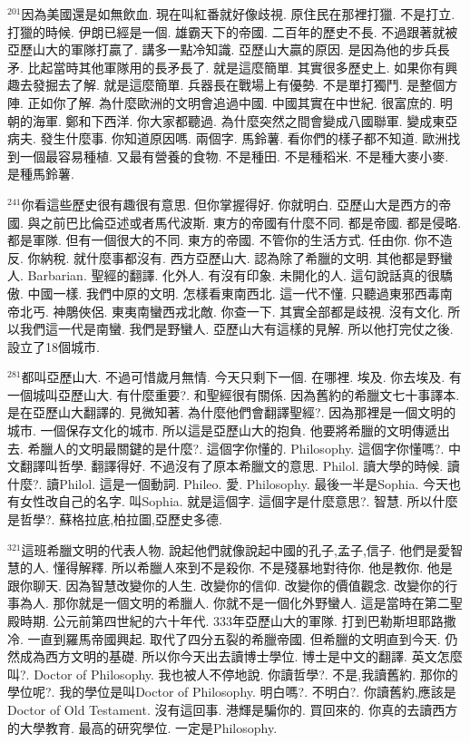 \documentclass{book}
\begin{document}
$^{201}$因為美國還是如無飲血.
現在叫紅番就好像歧視.
原住民在那裡打獵.
不是打立.
打獵的時候.
伊朗已經是一個.
雄霸天下的帝國.
二百年的歷史不長.
不過跟著就被亞歷山大的軍隊打贏了.
講多一點冷知識.
亞歷山大贏的原因.
是因為他的步兵長矛.
比起當時其他軍隊用的長矛長了.
就是這麼簡單.
其實很多歷史上.
如果你有興趣去發掘去了解.
就是這麼簡單.
兵器長在戰場上有優勢.
不是單打獨鬥.
是整個方陣.
正如你了解.
為什麼歐洲的文明會追過中國.
中國其實在中世紀.
很富庶的.
明朝的海軍.
鄭和下西洋.
你大家都聽過.
為什麼突然之間會變成八國聯軍.
變成東亞病夫.
發生什麼事.
你知道原因嗎.
兩個字.
馬鈴薯.
看你們的樣子都不知道.
歐洲找到一個最容易種植.
又最有營養的食物.
不是種田.
不是種稻米.
不是種大麥小麥.
是種馬鈴薯.

$^{241}$你看這些歷史很有趣很有意思.
但你掌握得好.
你就明白.
亞歷山大是西方的帝國.
與之前巴比倫亞述或者馬代波斯.
東方的帝國有什麼不同.
都是帝國.
都是侵略.
都是軍隊.
但有一個很大的不同.
東方的帝國.
不管你的生活方式.
任由你.
你不造反.
你納稅.
就什麼事都沒有.
西方亞歷山大.
認為除了希臘的文明.
其他都是野蠻人.
Barbarian.
聖經的翻譯.
化外人.
有沒有印象.
未開化的人.
這句說話真的很驕傲.
中國一樣.
我們中原的文明.
怎樣看東南西北.
這一代不懂.
只聽過東邪西毒南帝北丐.
神鵰俠侶.
東夷南蠻西戎北敵.
你查一下.
其實全部都是歧視.
沒有文化.
所以我們這一代是南蠻.
我們是野蠻人.
亞歷山大有這樣的見解.
所以他打完仗之後.
設立了18個城市.

$^{281}$都叫亞歷山大.
不過可惜歲月無情.
今天只剩下一個.
在哪裡.
埃及.
你去埃及.
有一個城叫亞歷山大.
有什麼重要?.
和聖經很有關係.
因為舊約的希臘文七十事譯本.
是在亞歷山大翻譯的.
見微知著.
為什麼他們會翻譯聖經?.
因為那裡是一個文明的城市.
一個保存文化的城市.
所以這是亞歷山大的抱負.
他要將希臘的文明傳遞出去.
希臘人的文明最關鍵的是什麼?.
這個字你懂的.
Philosophy.
這個字你懂嗎?.
中文翻譯叫哲學.
翻譯得好.
不過沒有了原本希臘文的意思.
Philol.
讀大學的時候.
讀什麼?.
讀Philol.
這是一個動詞.
Phileo.
愛.
Philosophy.
最後一半是Sophia.
今天也有女性改自己的名字.
叫Sophia.
就是這個字.
這個字是什麼意思?.
智慧.
所以什麼是哲學?.
蘇格拉底,柏拉圖,亞歷史多德.

$^{321}$這班希臘文明的代表人物.
說起他們就像說起中國的孔子,孟子,信子.
他們是愛智慧的人.
懂得解釋.
所以希臘人來到不是殺你.
不是殘暴地對待你.
他是教你.
他是跟你聊天.
因為智慧改變你的人生.
改變你的信仰.
改變你的價值觀念.
改變你的行事為人.
那你就是一個文明的希臘人.
你就不是一個化外野蠻人.
這是當時在第二聖殿時期.
公元前第四世紀的六十年代.
333年亞歷山大的軍隊.
打到巴勒斯坦耶路撒冷.
一直到羅馬帝國興起.
取代了四分五裂的希臘帝國.
但希臘的文明直到今天.
仍然成為西方文明的基礎.
所以你今天出去讀博士學位.
博士是中文的翻譯.
英文怎麼叫?.
Doctor of Philosophy.
我也被人不停地說.
你讀哲學?.
不是,我讀舊約.
那你的學位呢?.
我的學位是叫Doctor of Philosophy.
明白嗎?.
不明白?.
你讀舊約,應該是Doctor of Old Testament.
沒有這回事.
港輝是騙你的.
買回來的.
你真的去讀西方的大學教育.
最高的研究學位.
一定是Philosophy.
\end{document}
